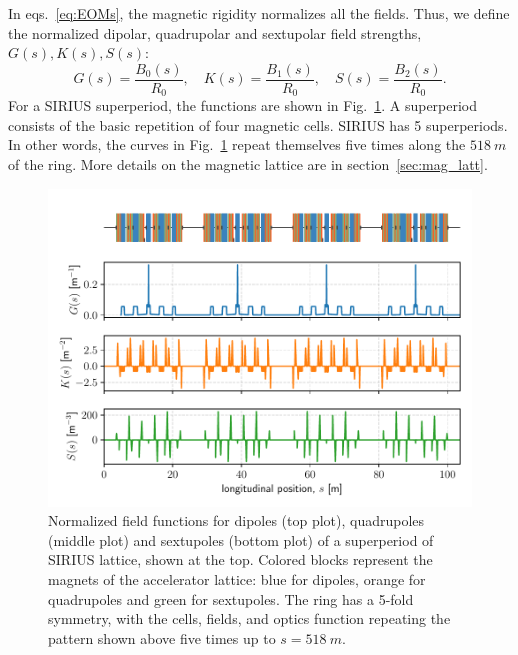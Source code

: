 In eqs.~\eqref{eq:EOMs}, the magnetic rigidity normalizes all the fields. Thus, we define the normalized dipolar, quadrupolar and sextupolar field strengths, $G(s), K(s), S(s)$:
\begin{equation}
    G(s) = \frac{B_0(s)}{R_0}, \quad K(s) = \frac{B_1(s)}{R_0}, \quad S(s) = \frac{B_2(s)}{R_0}.
    \label{eq:mag_funcs}
\end{equation}
For a SIRIUS superperiod, the functions are shown in Fig.~\ref{fig:field_funcs}. A superperiod consists of the basic repetition of four magnetic cells. SIRIUS has 5 superperiods. In other words, the curves in Fig.~\ref{fig:field_funcs} repeat themselves five times along the $518~\unit{m}$ of the ring. More details on the magnetic lattice are in section~\ref{sec:mag_latt}.
\begin{figure}[htb]
    \centering
    \includegraphics[width=\textwidth]{Images/field_functions.pdf}
    \caption[Normalized field functions for dipoles, quadrupoles and sextupoles of a superperiod of SIRIUS lattice]{Normalized field functions for dipoles (top plot), quadrupoles (middle plot) and sextupoles (bottom plot) of a superperiod of SIRIUS lattice, shown at the top. Colored blocks represent the magnets of the accelerator lattice: blue for dipoles, orange for quadrupoles and green for sextupoles. The ring has a 5-fold symmetry, with the cells, fields, and optics function repeating the pattern shown above five times up to $s=518~\unit{m}$.}
    \label{fig:field_funcs}
\end{figure}
